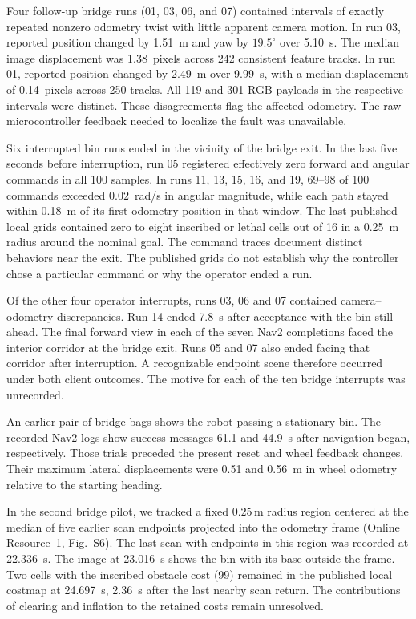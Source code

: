 \documentclass[pdflatex,sn-mathphys-num]{sn-jnl}
\newcommand{\m}{\,\mathrm{m}}
\begin{document}
Four follow-up bridge runs (01, 03, 06, and 07) contained intervals of exactly repeated nonzero odometry twist with little apparent camera motion. In run 03, reported position changed by 1.51~m and yaw by $19.5^\circ$ over 5.10~s. The median image displacement was 1.38~pixels across 242 consistent feature tracks. In run 01, reported position changed by 2.49~m over 9.99~s, with a median displacement of 0.14~pixels across 250 tracks. All 119 and 301 RGB payloads in the respective intervals were distinct. These disagreements flag the affected odometry. The raw microcontroller feedback needed to localize the fault was unavailable.

Six interrupted bin runs ended in the vicinity of the bridge exit. In the last five seconds before interruption, run 05 registered effectively zero forward and angular commands in all 100 samples. In runs 11, 13, 15, 16, and 19, 69--98 of 100 commands exceeded $0.02$~rad/s in angular magnitude, while each path stayed within 0.18~m of its first odometry position in that window. The last published local grids contained zero to eight inscribed or lethal cells out of 16 in a 0.25~m radius around the nominal goal. The command traces document distinct behaviors near the exit. The published grids do not establish why the controller chose a particular command or why the operator ended a run.

Of the other four operator interrupts, runs 03, 06 and 07 contained camera--odometry discrepancies. Run 14 ended 7.8~s after acceptance with the bin still ahead. The final forward view in each of the seven Nav2 completions faced the interior corridor at the bridge exit. Runs 05 and 07 also ended facing that corridor after interruption. A recognizable endpoint scene therefore occurred under both client outcomes. The motive for each of the ten bridge interrupts was unrecorded.

An earlier pair of bridge bags shows the robot passing a stationary bin. The recorded Nav2 logs show success messages 61.1 and 44.9~s after navigation began, respectively. Those trials preceded the present reset and wheel feedback changes. Their maximum lateral displacements were 0.51 and 0.56~m in wheel odometry relative to the starting heading.

In the second bridge pilot, we tracked a fixed $0.25\m$ radius region centered at the median of five earlier scan endpoints projected into the odometry frame (Online Resource~1, Fig.~S6). The last scan with endpoints in this region was recorded at 22.336~s. The image at 23.016~s shows the bin with its base outside the frame. Two cells with the inscribed obstacle cost (99) remained in the published local costmap at 24.697~s, 2.36~s after the last nearby scan return. The contributions of clearing and inflation to the retained costs remain unresolved.
\end{document}
